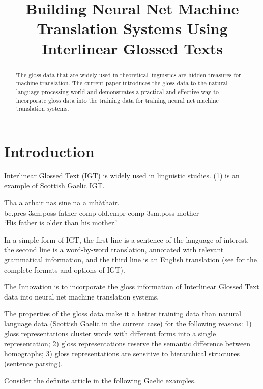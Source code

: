 \documentclass[a4paper]{article}
\title{Building Neural Net Machine Translation Systems Using Interlinear Glossed Texts}
\date{}
\begin{document}
\maketitle


\begin{abstract}
  The gloss data that are widely used in theoretical linguistics are hidden treasures for machine translation. 
  The current paper introduces the gloss data to the natural language processing world and demonstrates a practical and effective way to incorporate gloss data into the training data for training neural net machine translation systems. 
\end{abstract}

\section{Introduction}
Interlinear Glossed Text (IGT) is widely used in linguistic studies. (1)  is an example of Scottish Gaelic IGT.
\begin{exe}  
\ex \gll    Tha a athair nas sine na a mh\`athair.\\  
            be.pres 3sm.poss father comp old.cmpr comp 3sm.poss mother
\\  
    \glt    `His father is older than his mother.'  
\end{exe}

In a simple form of IGT, the first line is a sentence of the language of interest, the second line is a word-by-word translation, annotated with relevant grammatical information, and the third line is an English translation (see \citet{bickel2008leipzig} for the complete formats and options of IGT).  

The Innovation is to incorporate the gloss information of Interlinear Glossed Text data into neural net machine translation systems.

The properties of the gloss data make it a better training data than natural language data (Scottish Gaelic in the current case) for the following reasons: 1) gloss representations cluster words with different forms into a single representation; 2) gloss representations reserve the semantic difference between homographs; 3) gloss representations are sensitive to hierarchical structures (sentence parsing). 

Consider the definite article in the following Gaelic examples. 
\end{document}
